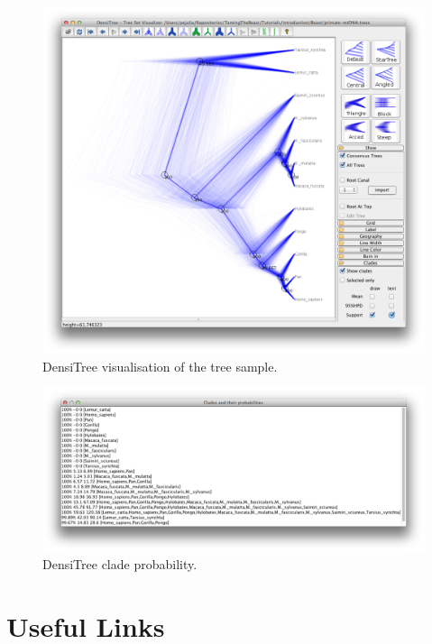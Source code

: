\documentclass[11pt]{article}
\begin{document}
\begin{figure}[H]
\centering
\includegraphics[width=5in]{figures/densitree.png}
\caption{\small DensiTree visualisation of the tree sample.}
\label{fig:densitree}
\end{figure}

\begin{figure}[H]
\centering
\includegraphics[width=5in]{figures/densitree_clades.png}
\caption{\small DensiTree clade probability.}
\label{fig:densitree_clades}
\end{figure}

\bigskip
\section{Useful Links}
\end{document}
